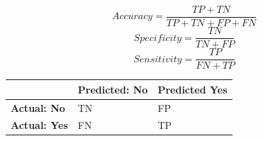\begin{equation}
	Accuracy = \frac{TP + TN}{TP+TN+FP+FN}
	\label{eq:accuracy}
\end{equation}
\begin{equation}
	Specificity = \frac{TN}{TN+FP}
	\label{eq:specificity}
\end{equation}
\begin{equation}
	Sensitivity = \frac{TP}{FN+TP}
	\label{eq:sensitivity}
\end{equation}

\begin{table}[H]
	\centering
	\begin{tabular}{L{3cm}|C{3cm}|C{3cm}|}
	 & \textbf{Predicted: No} & \textbf{Predicted Yes} \\
	\hline
	\textbf{Actual: No} & TN & FP \\
	\hline
	\textbf{Actual: Yes} & FN & TP \\
	\hline	
	\end{tabular}
\end{table}


